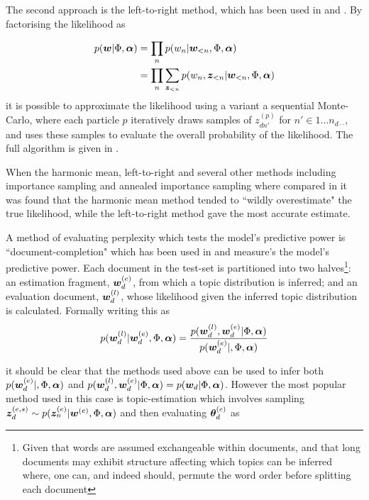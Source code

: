The second approach is the left-to-right method, which has been used in \cite{Mimno2011} and \cite{Mimno2012a}. By factorising the likelihood as

\begin{align}
p(\bm w|\Phi, \bm \alpha) & = \prod_n p(w_n | \bm w_{<n}, \Phi, \bm \alpha) \\
& = \prod_n \sum_{\bm z_{<n}} p(w_n, \bm z_{<n}| \bm w_{<n}, \Phi, \bm \alpha)
\end{align}
it is possible to approximate the likelihood using a variant a sequential Monte-Carlo, where each particle $p$ iteratively draws samples of $z^{(p)}_{dn'}$ for $n' \in 1 \ldots n_{d\cdot\cdot}$, and uses these samples to evaluate the overall probability of the likelihood. The full algorithm is given in \cite{Wallach2009}.

When the harmonic mean, left-to-right and several other methods including importance sampling and annealed importance sampling where compared in \cite{Wallach2009} it was found that the harmonic mean method tended to ``wildly overestimate" the true likelihood, while the left-to-right method gave the most accurate estimate.

A method of evaluating perplexity which tests the model's predictive power is ``document-completion" which has been used in \cite{Virtanen2012a}\cite{Asuncion2012}\cite{RosenZvi2004} and measure's the model's predictive power. Each document in the test-set is partitioned into two halves\footnote{Given that words are assumed exchangeable within documents, and that long documents may exhibit structure affecting which topics can be inferred where, one can, and indeed should, permute the word order before splitting each document}: an estimation fragment, $\bm w_d^{(e)}$, from which a topic distribution is inferred; and an evaluation document, $\bm w_d^{(l)}$, whose likelihood given the inferred topic distribution is calculated. Formally writing this as
\begin{align}
p(\bm w_d^{(l)}|\bm w_d^{(e)}, \Phi, \bm \alpha) = \frac{p(\bm w_d^{(l)},\bm w_d^{(e)} |\Phi, \bm \alpha)}{p(\bm w_d^{(e)}|, \Phi, \bm \alpha)}
\end{align}

it should be clear that the methods used above can be used to infer both $p(\bm w_d^{(e)}|, \Phi, \bm \alpha)$ and $p(\bm w_d^{(l)},\bm w_d^{(e)} | \Phi, \bm \alpha) = p(\bm w_d | \Phi, \bm \alpha)$. However the most  popular method used in this case is topic-estimation which involves sampling $\bm z_d^{(e,s)} \sim p(\bm z_n^{(e)} | \bm w^{(e)}, \Phi, \bm \alpha)$ and then evaluating $\bm \theta_d^{(e)}$ as

